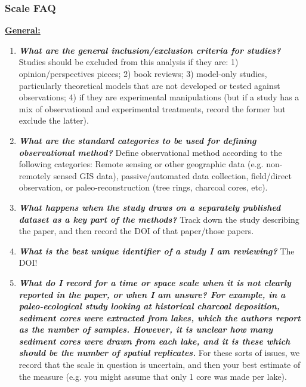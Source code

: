 \documentclass[12pt]{article}
\begin{document}
\subsubsection*{Scale FAQ}
\vspace{-10pt}
\noindent\underline{\textbf{General:}}
\def\Hitem{\item [Q\stepcounter{enumi}\arabic{enumi}.]} 
\def\Hsubitem{\item [Q\arabic{enumi}.\arabic{enumi}.]} 
\vspace{-0.5cm}
\begin{enumerate}
  \Hitem \emph{\textbf{What are the general inclusion/exclusion criteria for studies?}} Studies should be excluded from this analysis if they are: 1) opinion/perspectives pieces; 2) book reviews; 3) model-only studies, particularly theoretical models that are not developed or tested against observations; 4) if they are experimental manipulations (but if a study has a mix of observational and experimental treatments, record the former but exclude the latter).
  
  \Hitem \emph{\textbf{What are the standard categories to be used for defining observational method?}} Define observational method according to the following categories: Remote sensing or other geographic data (e.g. non-remotely sensed GIS data), passive/automated data collection, field/direct observation, or paleo-reconstruction (tree rings, charcoal cores, etc).

  \Hitem \emph{\textbf{What happens when the study draws on a separately published dataset as a key part of the methods?}} Track down the study describing the paper, and then record the DOI of that paper/those papers.
  
  \Hitem \emph{\textbf{What is the best unique identifier of a study I am reviewing?}} The DOI! 
  
  \Hitem \emph{\textbf{What do I record for a time or space scale when it is not clearly reported in the paper, or when I am unsure? For example, in a paleo-ecological study looking at historical charcoal deposition, sediment cores were extracted from lakes, which the authors report as the number of samples. However, it is unclear how many sediment cores were drawn from each lake, and it is these which should be the number of spatial replicates.}} For these sorts of issues, we record that the scale in question is uncertain, and then your best estimate of the measure (e.g. you might assume that only 1 core was made per lake).


\end{enumerate}
\end{document}
